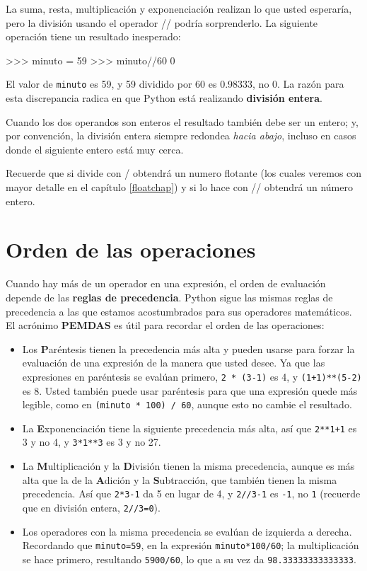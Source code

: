 La suma, resta, multiplicación y exponenciación realizan lo que usted
esperaría, pero la división usando el operador // podría sorprenderlo.
La siguiente operación tiene un resultado inesperado:

\begin{pyconcode}
>>> minuto = 59
>>> minuto//60
0
\end{pyconcode}

El valor de \texttt{minuto} es 59, y 59 dividido por 60 es 0.98333,
no 0. La razón para esta discrepancia radica en que Python está realizando
\textbf{división entera}.


Cuando los dos operandos son enteros el resultado también debe ser
un entero; y, por convención, la división entera siempre redondea
{\em hacia abajo}, incluso en casos donde el siguiente entero está
muy cerca.

Recuerde que si divide con / obtendrá un numero flotante (los cuales
veremos con mayor detalle en el capítulo \ref{floatchap}) y si lo
hace con // obtendrá un número entero. 

\section{Orden de las operaciones}

 

Cuando hay más de un operador en una expresión, el orden de evaluación
depende de las \textbf{reglas de precedencia}. Python sigue las mismas
reglas de precedencia a las que estamos acostumbrados para sus operadores
matemáticos. El acrónimo \textbf{PEMDAS} es útil para recordar el
orden de las operaciones:
\begin{itemize}
\item Los \textbf{P}aréntesis tienen la precedencia más alta y pueden usarse
para forzar la evaluación de una expresión de la manera que usted
desee. Ya que las expresiones en paréntesis se evalúan primero, \texttt{2
{*} (3-1)} es 4, y \texttt{(1+1){*}{*}(5-2)} es 8. Usted también puede
usar paréntesis para que una expresión quede más legible, como en
\texttt{(minuto {*} 100) / 60}, aunque esto no cambie el resultado.
\item La \textbf{E}xponenciación tiene la siguiente precedencia más alta,
así que \texttt{2{*}{*}1+1} es 3 y no 4, y \texttt{3{*}1{*}{*}3} es
3 y no 27.
\item La \textbf{M}ultiplicación y la \textbf{D}ivisión tienen la misma
precedencia, aunque es más alta que la de la \textbf{A}dición y la
\textbf{S}ubtracción, que también tienen la misma precedencia. Así
que \texttt{2{*}3-1} da 5 en lugar de 4, y \texttt{2//3-1} es \texttt{-1},
no \texttt{1} (recuerde que en división entera, \texttt{2//3=0}).
\item Los operadores con la misma precedencia se evalúan de izquierda a
derecha. Recordando que \texttt{minuto=59}, en la expresión \texttt{minuto{*}100/60};
la multiplicación se hace primero, resultando \texttt{5900/60}, lo
que a su vez da \texttt{98.33333333333333}.
\end{itemize}

